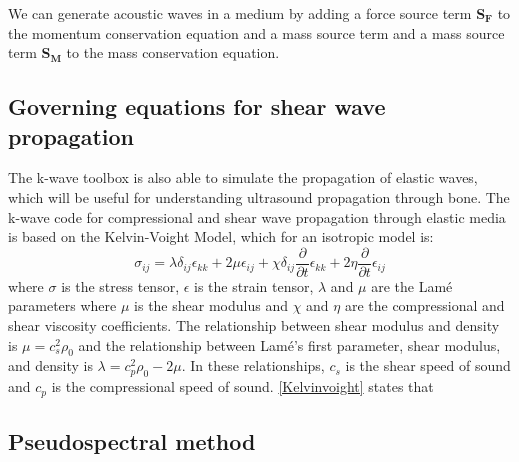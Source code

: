 \documentclass[10pt,a4paper]{article}
\begin{document}
We can generate acoustic waves in a medium by adding a force source term \textbf{S$_\textbf{F}$} to the momentum conservation equation and a mass source term and a mass source term \textbf{S$_\textbf{M}$} to the mass conservation equation.

\subsection{Governing equations for shear wave propagation}

The k-wave toolbox is also able to simulate the propagation of elastic waves, which will be useful for understanding ultrasound propagation through bone. The k-wave code for compressional and shear wave propagation through elastic media is based on the Kelvin-Voight Model, which for an isotropic model is:
\begin{equation} \label{Kelvinvoight}
\sigma_{ij} = \lambda \delta_{ij} \epsilon_{kk} + 2 \mu \epsilon_{ij} + \chi \delta_{ij} \dfrac{\partial}{\partial t} \epsilon_{kk} + 2 \eta \dfrac{\partial}{\partial t} \epsilon_{ij} 
\end{equation}
where $\sigma$ is the stress tensor, $\epsilon$ is the strain tensor, $\lambda$ and $\mu$ are the Lam\'{e} parameters where $\mu$ is the shear modulus and $\chi$ and $\eta$ are the compressional and shear viscosity coefficients. The relationship between shear modulus and density is $\mu = c_s^2\rho_0$ and the relationship between Lam\'{e}'s first parameter, shear modulus, and density is $\lambda = c_p^2 \rho_0 - 2 \mu$. In these relationships, $c_s$ is the shear speed of sound and $c_p$ is the compressional speed of sound. \autoref{Kelvinvoight} states that 

\subsection*{Pseudospectral method}
\end{document}
